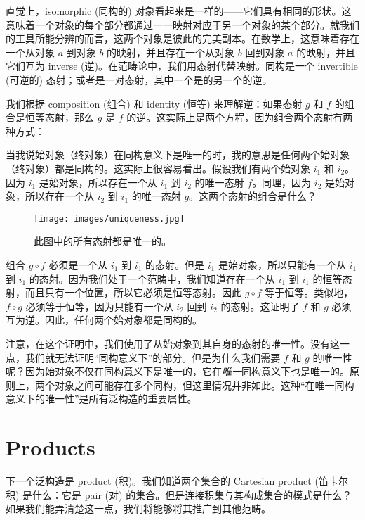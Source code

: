 直觉上，isomorphic (同构的) 对象看起来是一样的——它们具有相同的形状。这意味着一个对象的每个部分都通过一一映射对应于另一个对象的某个部分。就我们的工具所能分辨的而言，这两个对象是彼此的完美副本。在数学上，这意味着存在一个从对象 $a$ 到对象 $b$ 的映射，并且存在一个从对象 $b$ 回到对象 $a$ 的映射，并且它们互为 inverse (逆)。在范畴论中，我们用态射代替映射。同构是一个 invertible (可逆的) 态射；或者是一对态射，其中一个是的另一个的逆。

我们根据 composition (组合) 和 identity (恒等) 来理解逆：如果态射 $g$ 和 $f$ 的组合是恒等态射，那么 $g$ 是 $f$ 的逆。这实际上是两个方程，因为组合两个态射有两种方式：

当我说始对象（终对象）在同构意义下是唯一的时，我的意思是任何两个始对象（终对象）都是同构的。这实际上很容易看出。假设我们有两个始对象 $i_{1}$ 和 $i_{2}$。因为 $i_{1}$ 是始对象，所以存在一个从 $i_{1}$ 到 $i_{2}$ 的唯一态射 $f$。同理，因为 $i_{2}$ 是始对象，所以存在一个从 $i_{2}$ 到 $i_{1}$ 的唯一态射 $g$。这两个态射的组合是什么？

\begin{figure}[H]
  \centering
  \texttt{[image: images/uniqueness.jpg]}
  \caption{此图中的所有态射都是唯一的。}
\end{figure}

\noindent
组合 $g \circ f$ 必须是一个从 $i_{1}$ 到 $i_{1}$ 的态射。但是 $i_{1}$ 是始对象，所以只能有一个从 $i_{1}$ 到 $i_{1}$ 的态射。因为我们处于一个范畴中，我们知道存在一个从 $i_{1}$ 到 $i_{1}$ 的恒等态射，而且只有一个位置，所以它必须是恒等态射。因此 $g \circ f$ 等于恒等。类似地，$f \circ g$ 必须等于恒等，因为只能有一个从 $i_{2}$ 回到 $i_{2}$ 的态射。这证明了 $f$ 和 $g$ 必须互为逆。因此，任何两个始对象都是同构的。

注意，在这个证明中，我们使用了从始对象到其自身的态射的唯一性。没有这一点，我们就无法证明“同构意义下”的部分。但是为什么我们需要 $f$ 和 $g$ 的唯一性呢？因为始对象不仅在同构意义下是唯一的，它在\emph{唯一}同构意义下也是唯一的。原则上，两个对象之间可能存在多个同构，但这里情况并非如此。这种“在唯一同构意义下的唯一性”是所有泛构造的重要属性。

\section{Products}

下一个泛构造是 product (积)。我们知道两个集合的 Cartesian product (笛卡尔积) 是什么：它是 pair (对) 的集合。但是连接积集与其构成集合的模式是什么？如果我们能弄清楚这一点，我们将能够将其推广到其他范畴。

